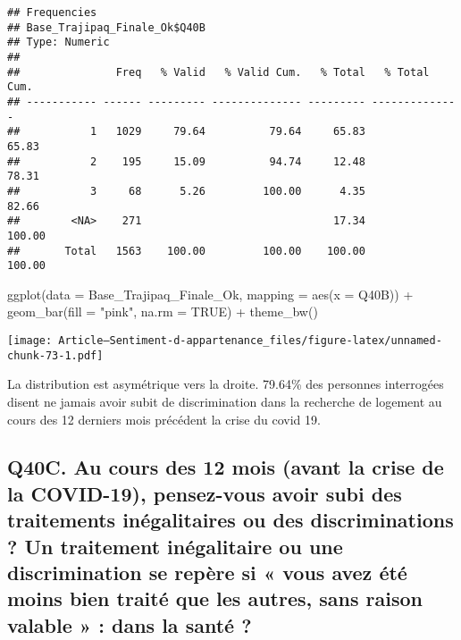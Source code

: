 \documentclass[
]{article}
\newenvironment{Shaded}{\begin{snugshade}}{\end{snugshade}}
\newcommand{\AttributeTok}[1]{\textcolor[rgb]{0.77,0.63,0.00}{#1}}
\newcommand{\ConstantTok}[1]{\textcolor[rgb]{0.00,0.00,0.00}{#1}}
\newcommand{\FunctionTok}[1]{\textcolor[rgb]{0.00,0.00,0.00}{#1}}
\newcommand{\NormalTok}[1]{#1}
\newcommand{\SpecialCharTok}[1]{\textcolor[rgb]{0.00,0.00,0.00}{#1}}
\newcommand{\StringTok}[1]{\textcolor[rgb]{0.31,0.60,0.02}{#1}}
\begin{document}
\begin{Shaded}
\end{Shaded}

\begin{verbatim}
## Frequencies  
## Base_Trajipaq_Finale_Ok$Q40B  
## Type: Numeric  
## 
##               Freq   % Valid   % Valid Cum.   % Total   % Total Cum.
## ----------- ------ --------- -------------- --------- --------------
##           1   1029     79.64          79.64     65.83          65.83
##           2    195     15.09          94.74     12.48          78.31
##           3     68      5.26         100.00      4.35          82.66
##        <NA>    271                              17.34         100.00
##       Total   1563    100.00         100.00    100.00         100.00
\end{verbatim}

\begin{Shaded}
\begin{Highlighting}[]
\FunctionTok{ggplot}\NormalTok{(}\AttributeTok{data =}\NormalTok{ Base\_Trajipaq\_Finale\_Ok, }\AttributeTok{mapping =} \FunctionTok{aes}\NormalTok{(}\AttributeTok{x =}\NormalTok{ Q40B)) }\SpecialCharTok{+}
  \FunctionTok{geom\_bar}\NormalTok{(}\AttributeTok{fill =} \StringTok{"pink"}\NormalTok{, }\AttributeTok{na.rm =} \ConstantTok{TRUE}\NormalTok{) }\SpecialCharTok{+}
  \FunctionTok{theme\_bw}\NormalTok{()}
\end{Highlighting}
\end{Shaded}

\texttt{[image: Article---Sentiment-d-appartenance\_files/figure-latex/unnamed-chunk-73-1.pdf]}

La distribution est asymétrique vers la droite. 79.64\% des personnes
interrogées disent ne jamais avoir subit de discrimination dans la
recherche de logement au cours des 12 derniers mois précédent la crise
du covid 19.

\hypertarget{q40c.-au-cours-des-12-mois-avant-la-crise-de-la-covid-19-pensez-vous-avoir-subi-des-traitements-inuxe9galitaires-ou-des-discriminations-un-traitement-inuxe9galitaire-ou-une-discrimination-se-repuxe8re-si-vous-avez-uxe9tuxe9-moins-bien-traituxe9-que-les-autres-sans-raison-valable-dans-la-santuxe9}{%
\subsection{Q40C. Au cours des 12 mois (avant la crise de la COVID-19),
pensez-vous avoir subi des traitements inégalitaires ou des
discriminations ? Un traitement inégalitaire ou une discrimination se
repère si « vous avez été moins bien traité que les autres, sans raison
valable » : dans la santé
?}\label{q40c.-au-cours-des-12-mois-avant-la-crise-de-la-covid-19-pensez-vous-avoir-subi-des-traitements-inuxe9galitaires-ou-des-discriminations-un-traitement-inuxe9galitaire-ou-une-discrimination-se-repuxe8re-si-vous-avez-uxe9tuxe9-moins-bien-traituxe9-que-les-autres-sans-raison-valable-dans-la-santuxe9}}
\end{document}
